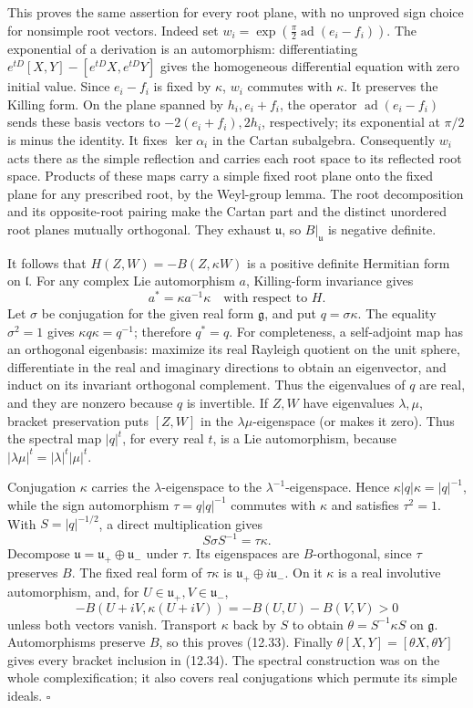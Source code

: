 \documentclass[
  11pt,
]{article}
\begin{document}
This proves the same assertion for every root plane, with no unproved
sign choice for nonsimple root vectors. Indeed set
\(w_i=\exp(\frac\pi2\operatorname{ad}(e_i-f_i))\). The exponential of a
derivation is an automorphism: differentiating
\(e^{tD}[X,Y]-[e^{tD}X,e^{tD}Y]\) gives the homogeneous differential
equation with zero initial value. Since \(e_i-f_i\) is fixed by
\(\kappa\), \(w_i\) commutes with \(\kappa\). It preserves the Killing
form. On the plane spanned by \(h_i,e_i+f_i\), the operator
\(\operatorname{ad}(e_i-f_i)\) sends these basis vectors to
\(-2(e_i+f_i),2h_i\), respectively; its exponential at \(\pi/2\) is
minus the identity. It fixes \(\ker\alpha_i\) in the Cartan subalgebra.
Consequently \(w_i\) acts there as the simple reflection and carries
each root space to its reflected root space. Products of these maps
carry a simple fixed root plane onto the fixed plane for any prescribed
root, by the Weyl-group lemma. The root decomposition and its
opposite-root pairing make the Cartan part and the distinct unordered
root planes mutually orthogonal. They exhaust \(\mathfrak u\), so
\(B|_{\mathfrak u}\) is negative definite.

It follows that \(H(Z,W)=-B(Z,\kappa W)\) is a positive definite
Hermitian form on \(\mathfrak l\). For any complex Lie automorphism
\(a\), Killing-form invariance gives \[
a^*=\kappa a^{-1}\kappa
\quad\text{with respect to }H.
\] Let \(\sigma\) be conjugation for the given real form
\(\mathfrak g\), and put \(q=\sigma\kappa\). The equality \(\sigma^2=1\)
gives \(\kappa q\kappa=q^{-1}\); therefore \(q^*=q\). For completeness,
a self-adjoint map has an orthogonal eigenbasis: maximize its real
Rayleigh quotient on the unit sphere, differentiate in the real and
imaginary directions to obtain an eigenvector, and induct on its
invariant orthogonal complement. Thus the eigenvalues of \(q\) are real,
and they are nonzero because \(q\) is invertible. If \(Z,W\) have
eigenvalues \(\lambda,\mu\), bracket preservation puts \([Z,W]\) in the
\(\lambda\mu\)-eigenspace (or makes it zero). Thus the spectral map
\(|q|^t\), for every real \(t\), is a Lie automorphism, because
\(|\lambda\mu|^t=|\lambda|^t|\mu|^t\).

Conjugation \(\kappa\) carries the \(\lambda\)-eigenspace to the
\(\lambda^{-1}\)-eigenspace. Hence \(\kappa|q|\kappa=|q|^{-1}\), while
the sign automorphism \(\tau=q|q|^{-1}\) commutes with \(\kappa\) and
satisfies \(\tau^2=1\). With \(S=|q|^{-1/2}\), a direct multiplication
gives \[
S\sigma S^{-1}=\tau\kappa.
\] Decompose \(\mathfrak u=\mathfrak u_+\oplus\mathfrak u_-\) under
\(\tau\). Its eigenspaces are \(B\)-orthogonal, since \(\tau\) preserves
\(B\). The fixed real form of \(\tau\kappa\) is
\(\mathfrak u_+\oplus i\mathfrak u_-\). On it \(\kappa\) is a real
involutive automorphism, and, for
\(U\in\mathfrak u_+,V\in\mathfrak u_-\), \[
-B(U+iV,\kappa(U+iV))=-B(U,U)-B(V,V)>0
\] unless both vectors vanish. Transport \(\kappa\) back by \(S\) to
obtain \(\theta=S^{-1}\kappa S\) on \(\mathfrak g\). Automorphisms
preserve \(B\), so this proves (12.33). Finally
\(\theta[X,Y]=[\theta X,\theta Y]\) gives every bracket inclusion in
(12.34). The spectral construction was on the whole complexification; it
also covers real conjugations which permute its simple ideals.
\(\square\)
\end{document}
